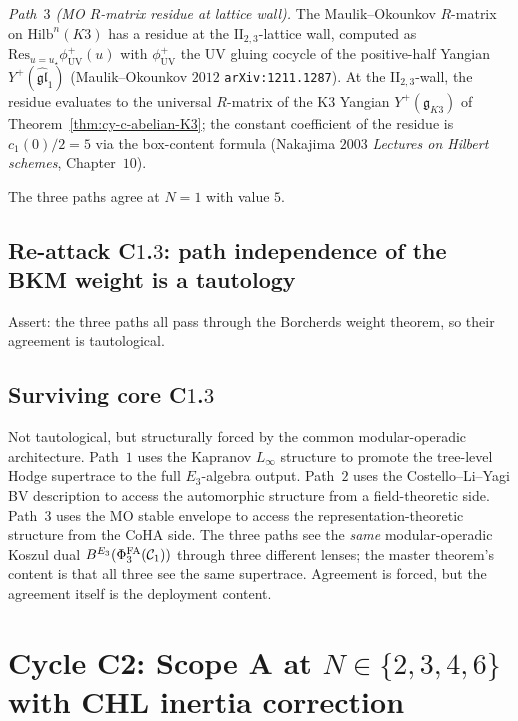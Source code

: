 \emph{Path~$3$ (MO $R$-matrix residue at lattice wall).} The
Maulik--Okounkov $R$-matrix on $\mathrm{Hilb}^n(K3)$ has a residue at
the $\mathrm{II}_{2, 3}$-lattice wall, computed as
$\mathrm{Res}_{u = u_\star} \phi^+_{\mathrm{UV}}(u)$ with
$\phi^+_{\mathrm{UV}}$ the UV gluing cocycle of the positive-half
Yangian $Y^+(\widehat{\mathfrak{gl}}_1)$ (Maulik--Okounkov $2012$
\texttt{arXiv:1211.1287}). At the $\mathrm{II}_{2, 3}$-wall, the residue
evaluates to the universal $R$-matrix of the K$3$ Yangian
$Y^{\mathrm{+}}(\mathfrak{g}_{K3})$ of
Theorem~\ref{thm:cy-c-abelian-K3}; the constant coefficient of the
residue is $c_1(0)/2 = 5$ via the box-content formula (Nakajima $2003$
\emph{Lectures on Hilbert schemes}, Chapter~$10$).

The three paths agree at $N = 1$ with value $5$.

\subsection*{Re-attack C$1$.$3$: path independence of the BKM weight is
a tautology}

Assert: the three paths all pass through the Borcherds weight theorem,
so their agreement is tautological.

\subsection*{Surviving core C$1$.$3$}

Not tautological, but structurally forced by the common modular-operadic
architecture. Path~$1$ uses the Kapranov $L_\infty$ structure to
promote the tree-level Hodge supertrace to the full $E_3$-algebra
output. Path~$2$ uses the Costello--Li--Yagi BV description to access
the automorphic structure from a field-theoretic side. Path~$3$ uses
the MO stable envelope to access the representation-theoretic structure
from the CoHA side. The three paths see the \emph{same}
modular-operadic Koszul dual $B^{E_{3}}(\Phi^{\mathrm{FA}}_{3}(\mathcal{C}_1))$ through three
different lenses; the master theorem's content is that all three see
the same supertrace. Agreement is forced, but the agreement itself is
the deployment content.

\section{Cycle C2: Scope A at $N \in \{2, 3, 4, 6\}$ with CHL inertia
correction}
\label{sec:cycle-c2-chl-inertia}

